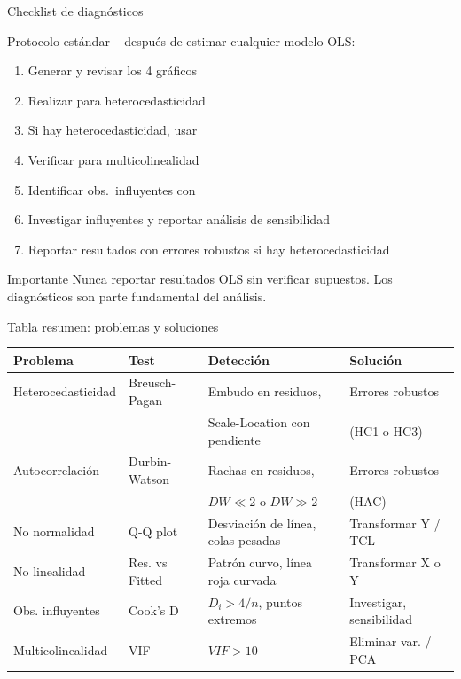 \documentclass[aspectratio=169, 11pt]{beamer}
\begin{document}
\begin{frame}{Checklist de diagnósticos}
\begin{block}{Protocolo estándar -- después de estimar cualquier modelo OLS:}
\begin{enumerate}
\item Generar  y revisar los 4 gráficos
\item Realizar  para heterocedasticidad
\item Si hay heterocedasticidad, usar 
\item Verificar  para multicolinealidad
\item Identificar obs.\ influyentes con 
\item Investigar influyentes y reportar análisis de sensibilidad
\item Reportar resultados con errores robustos si hay heterocedasticidad
\end{enumerate}
\end{block}

\vspace{0.1cm}
\begin{alertblock}{Importante}
Nunca reportar resultados OLS sin verificar supuestos. Los diagnósticos son parte fundamental del análisis.
\end{alertblock}
\end{frame}

\begin{frame}{Tabla resumen: problemas y soluciones}
\footnotesize
\begin{center}
\renewcommand{\arraystretch}{1.2}
\begin{tabular}{llll}
\toprule
\textbf{Problema} & \textbf{Test} & \textbf{Detección} & \textbf{Solución} \\
\midrule
Heterocedasticidad & Breusch-Pagan & Embudo en residuos, & Errores robustos \\
 &  & Scale-Location con pendiente & (HC1 o HC3) \\
\midrule
Autocorrelación & Durbin-Watson & Rachas en residuos, & Errores robustos \\
 &  & $DW \ll 2$ o $DW \gg 2$ & (HAC) \\
\midrule
No normalidad & Q-Q plot & Desviación de línea, colas pesadas & Transformar Y / TCL \\
\midrule
No linealidad & Res. vs Fitted & Patrón curvo, línea roja curvada & Transformar X o Y \\
\midrule
Obs. influyentes & Cook's D & $D_i > 4/n$, puntos extremos & Investigar, sensibilidad \\
\midrule
Multicolinealidad & VIF & $VIF > 10$ & Eliminar var. / PCA \\
\bottomrule
\end{tabular}
\end{center}
\end{frame}
\end{document}
